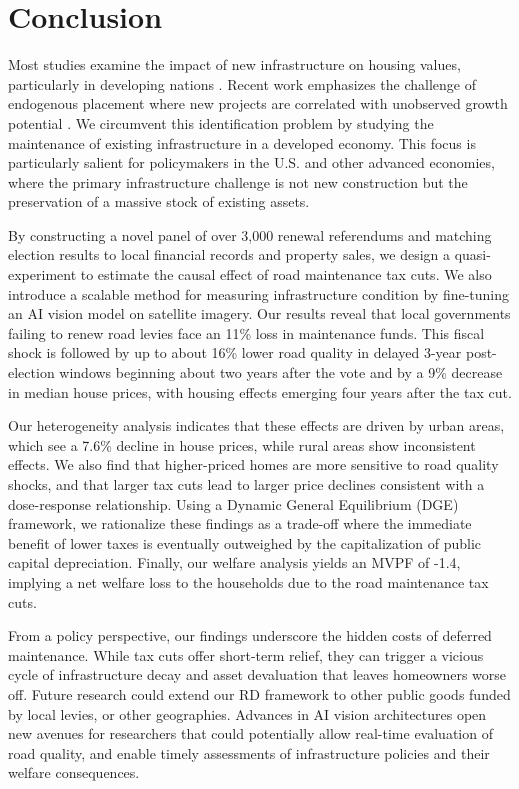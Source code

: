 

\section{Conclusion} \label{sec:conclusion}

Most studies examine the impact of new infrastructure on housing values, particularly in developing nations \citep{asher2020, huang2016understanding, li2016wheels}. Recent work emphasizes the challenge of endogenous placement where new projects are correlated with unobserved growth potential \citep{biasi_what_2025, donaldson2016railroads}. We circumvent this identification problem by studying the maintenance of existing infrastructure in a developed economy. This focus is particularly salient for policymakers in the U.S. and other advanced economies, where the primary infrastructure challenge is not new construction but the preservation of a massive stock of existing assets.

By constructing a novel panel of over 3,000 renewal referendums and matching election results to local financial records and property sales, we design a quasi-experiment to estimate the causal effect of road maintenance tax cuts. We also introduce a scalable method for measuring infrastructure condition by fine-tuning an AI vision model on satellite imagery. Our results reveal that local governments failing to renew road levies face an 11\% loss in maintenance funds. This fiscal shock is followed by up to about 16\% lower road quality in delayed 3-year post-election windows beginning about two years after the vote and by a 9\% decrease in median house prices, with housing effects emerging four years after the tax cut.

Our heterogeneity analysis indicates that these effects are driven by urban areas, which see a 7.6\% decline in house prices, while rural areas show inconsistent effects. We also find that higher-priced homes are more sensitive to road quality shocks, and that larger tax cuts lead to larger price declines consistent with a dose-response relationship. Using a Dynamic General Equilibrium (DGE) framework, we rationalize these findings as a trade-off where the immediate benefit of lower taxes is eventually outweighed by the capitalization of public capital depreciation. Finally, our welfare analysis yields an MVPF of -1.4, implying a net welfare loss to the households due to the road maintenance tax cuts.

From a policy perspective, our findings underscore the hidden costs of deferred maintenance. While tax cuts offer short-term relief, they can trigger a vicious cycle of infrastructure decay and asset devaluation that leaves homeowners worse off. Future research could extend our RD framework to other public goods funded by local levies, or other geographies. Advances in AI vision architectures open new avenues for researchers that could potentially allow real-time evaluation of road quality, and enable timely assessments of infrastructure policies and their welfare consequences.

